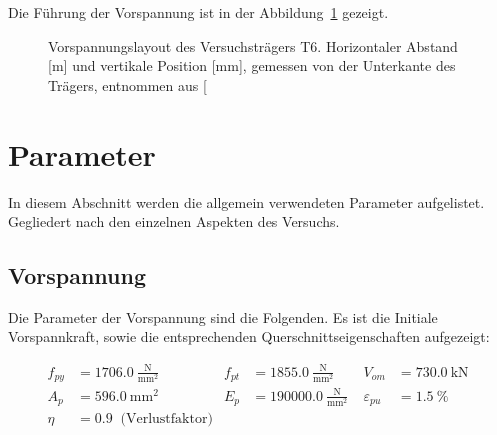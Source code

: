 \documentclass[
  11pt,
  letterpaper,
]{scrreprt}
\begin{document}
Die Führung der Vorspannung ist in der
Abbildung~\ref{fig-vorspannung_t6} gezeigt.

\begin{figure}[H]


\caption{\label{fig-vorspannung_t6}Vorspannungslayout des
Versuchsträgers T6. Horizontaler Abstand {[}m{]} und vertikale Position
{[}mm{]}, gemessen von der Unterkante des Trägers, entnommen aus
{[}\citeproc{ref-sigrist_versuche_1993}{5}{]}}

\end{figure}%

\section{Parameter}\label{parameter}

In diesem Abschnitt werden die allgemein verwendeten Parameter
aufgelistet. Gegliedert nach den einzelnen Aspekten des Versuchs.

\subsection{Vorspannung}\label{vorspannung}

Die Parameter der Vorspannung sind die Folgenden. Es ist die Initiale
Vorspannkraft, sowie die entsprechenden Querschnittseigenschaften
aufgezeigt:

$$
\begin{aligned}
f_{py} &= 1706.0\ \frac{\mathrm{N}}{\mathrm{mm}^{2}} \; 
 &f_{pt} &= 1855.0\ \frac{\mathrm{N}}{\mathrm{mm}^{2}} \; 
 &V_{om} &= 730.0\ \mathrm{kN} \; 
\\[11pt]
 A_{p} &= 596.0\ \mathrm{mm}^{2} \; 
 &E_{p} &= 190000.0\ \frac{\mathrm{N}}{\mathrm{mm}^{2}} \; 
 &\varepsilon_{pu} &= 1.5\ \mathrm{\%} \; 
\\[11pt]
 \eta &= 0.9 \; \;\textrm{(Verlustfaktor)}
\end{aligned}
$$
\end{document}
